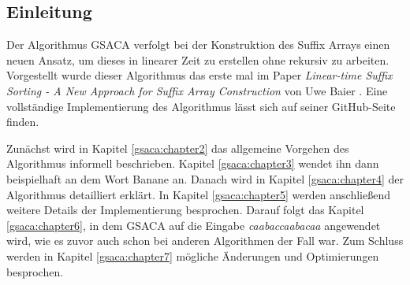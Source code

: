\subsection{Einleitung}
\label{gsaca:chapter1}
%
Der  Algorithmus GSACA verfolgt bei der Konstruktion des Suffix Arrays einen neuen Ansatz, um dieses in linearer Zeit zu erstellen ohne rekursiv zu arbeiten.
Vorgestellt wurde dieser Algorithmus das erste mal im Paper \textit{Linear-time Suffix Sorting - A New Approach for Suffix Array Construction} von Uwe Baier \cite{saca:3}. 
Eine vollständige Implementierung des Algorithmus lässt sich auf seiner GitHub-Seite \cite{saca:3:github} finden. \par
Zunächst wird in Kapitel \ref{gsaca:chapter2} das allgemeine Vorgehen des Algorithmus informell beschrieben. 
Kapitel \ref{gsaca:chapter3} wendet ihn dann beispielhaft an dem Wort Banane an. 
Danach wird in Kapitel \ref{gsaca:chapter4} der Algorithmus detailliert erklärt. 
In Kapitel \ref{gsaca:chapter5} werden anschließend weitere Details der Implementierung besprochen.
Darauf folgt das Kapitel \ref{gsaca:chapter6}, in dem GSACA auf die Eingabe \textit{caabaccaabacaa} angewendet wird, wie es zuvor auch schon bei anderen Algorithmen der Fall war.
Zum Schluss werden in Kapitel \ref{gsaca:chapter7} mögliche Änderungen und Optimierungen besprochen. 

